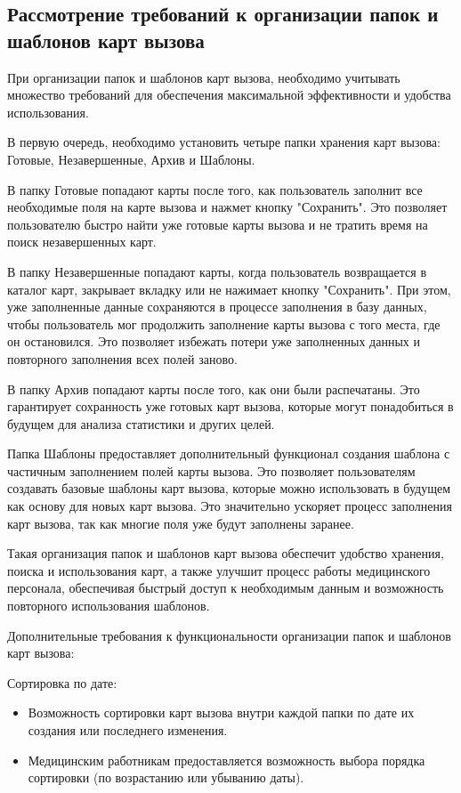 \subsection{Рассмотрение требований к организации папок и шаблонов карт вызова}

При организации папок и шаблонов карт вызова, необходимо учитывать множество требований для обеспечения максимальной эффективности и удобства использования.

В первую очередь, необходимо установить четыре папки хранения карт вызова: Готовые, Незавершенные, Архив и Шаблоны.

В папку Готовые попадают карты после того, как пользователь заполнит все необходимые поля на карте вызова и нажмет кнопку "Сохранить". Это позволяет пользователю быстро найти уже готовые карты вызова и не тратить время на поиск незавершенных карт.

В папку Незавершенные попадают карты, когда пользователь возвращается в каталог карт, закрывает вкладку или не нажимает кнопку "Сохранить". При этом, уже заполненные данные сохраняются в процессе заполнения в базу данных, чтобы пользователь мог продолжить заполнение карты вызова с того места, где он остановился. Это позволяет избежать потери уже заполненных данных и повторного заполнения всех полей заново.

В папку Архив попадают карты после того, как они были распечатаны. Это гарантирует сохранность уже готовых карт вызова, которые могут понадобиться в будущем для анализа статистики и других целей.

Папка Шаблоны предоставляет дополнительный функционал создания шаблона с частичным заполнением полей карты вызова. Это позволяет пользователям создавать базовые шаблоны карт вызова, которые можно использовать в будущем как основу для новых карт вызова. Это значительно ускоряет процесс заполнения карт вызова, так как многие поля уже будут заполнены заранее.

Такая организация папок и шаблонов карт вызова обеспечит удобство хранения, поиска и использования карт, а также улучшит процесс работы медицинского персонала, обеспечивая быстрый доступ к необходимым данным и возможность повторного использования шаблонов.

Дополнительные требования к функциональности организации папок и шаблонов карт вызова:

Сортировка по дате:

\begin{itemize}
    \item Возможность сортировки карт вызова внутри каждой папки по дате их создания или последнего изменения.
    \item Медицинским работникам предоставляется возможность выбора порядка сортировки (по возрастанию или убыванию даты).
\end{itemize}

